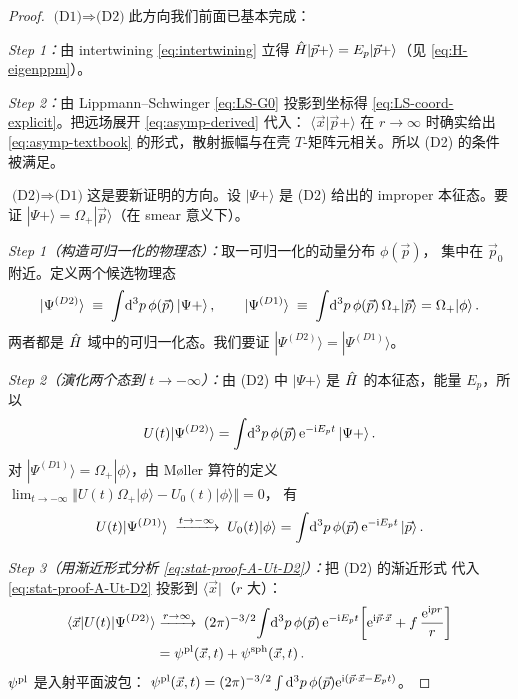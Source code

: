 \begin{proof}
$\boxed{\text{(D1)}\Rightarrow\text{(D2)}}$\quad 此方向我们前面已基本完成：

\textit{Step 1：}由 intertwining \eqref{eq:intertwining} 立得 $\hat{H}|\vec p+\rangle
= E_p|\vec p+\rangle$（见 \eqref{eq:H-eigenppm}）。

\textit{Step 2：}由 Lippmann--Schwinger \eqref{eq:LS-G0} 投影到坐标得
\eqref{eq:LS-coord-explicit}。把远场展开 \eqref{eq:asymp-derived} 代入：
$\langle\vec x|\vec p+\rangle$ 在 $r\to\infty$ 时确实给出 \eqref{eq:asymp-textbook}
的形式，散射振幅与在壳 $T$-矩阵元相关。所以 (D2) 的条件被满足。

$\boxed{\text{(D2)}\Rightarrow\text{(D1)}}$\quad 这是要新证明的方向。设 $|\Psi+\rangle$
是 (D2) 给出的 improper 本征态。要证 $|\Psi+\rangle = \Omega_+|\vec p\rangle$（在
smear 意义下）。

\textit{Step 1（构造可归一化的物理态）：}取一可归一化的动量分布 $\phi(\vec p)$，
集中在 $\vec p_0$ 附近。定义两个候选物理态
\begin{equation}
  |\Psi^{(D2)}\rangle \;\equiv\; \int\!\mathrm{d}^3 p\,\phi(\vec p)\,|\Psi+\rangle\,,
  \qquad
  |\Psi^{(D1)}\rangle \;\equiv\; \int\!\mathrm{d}^3 p\,\phi(\vec p)\,\Omega_+|\vec p\rangle
  = \Omega_+|\phi\rangle\,.
  \label{eq:stat-proof-A-twocandidates}
\end{equation}
两者都是 $\hat{H}$ 域中的可归一化态。我们要证 $|\Psi^{(D2)}\rangle = |\Psi^{(D1)}\rangle$。

\textit{Step 2（演化两个态到 $t\to-\infty$）：}由 (D2) 中 $|\Psi+\rangle$ 是 $\hat{H}$
的本征态，能量 $E_p$，所以
\begin{equation}
  U(t)|\Psi^{(D2)}\rangle = \int\!\mathrm{d}^3 p\,\phi(\vec p)\,\mathrm{e}^{-\mathrm{i} E_p t}\,
  |\Psi+\rangle\,.
  \label{eq:stat-proof-A-Ut-D2}
\end{equation}
对 $|\Psi^{(D1)}\rangle = \Omega_+|\phi\rangle$，由 M\o ller 算符的定义
$\lim_{t\to-\infty}\Vert U(t)\Omega_+|\phi\rangle - U_0(t)|\phi\rangle\Vert = 0$，
有
\begin{equation}
  U(t)|\Psi^{(D1)}\rangle \;\xrightarrow{t\to-\infty}\; U_0(t)|\phi\rangle
  = \int\!\mathrm{d}^3 p\,\phi(\vec p)\,\mathrm{e}^{-\mathrm{i} E_p t}\,|\vec p\rangle\,.
  \label{eq:stat-proof-A-D1-asymp}
\end{equation}

\textit{Step 3（用渐近形式分析 \eqref{eq:stat-proof-A-Ut-D2}）：}把 (D2) 的渐近形式
代入 \eqref{eq:stat-proof-A-Ut-D2} 投影到 $\langle\vec x|$（$r$ 大）：
\begin{align}
  \langle\vec x|U(t)|\Psi^{(D2)}\rangle
  &\xrightarrow{r\to\infty}\;
   (2\pi)^{-3/2}\!\int\!\mathrm{d}^3 p\,\phi(\vec p)\,\mathrm{e}^{-\mathrm{i} E_p t}
   \!\left[\mathrm{e}^{\mathrm{i}\vec p\cdot\vec x}+f\,\frac{\mathrm{e}^{\mathrm{i} p r}}{r}\right]\nonumber\\
  &= \psi^{\rm pl}(\vec x,t) + \psi^{\rm sph}(\vec x,t)\,.
  \label{eq:stat-proof-A-decomp}
\end{align}
$\psi^{\rm pl}$ 是入射平面波包：
$\psi^{\rm pl}(\vec x,t) = (2\pi)^{-3/2}\int\mathrm{d}^3p\,\phi(\vec p)\mathrm{e}^{\mathrm{i}(\vec p\cdot\vec x - E_p t)}$。


\end{proof}
